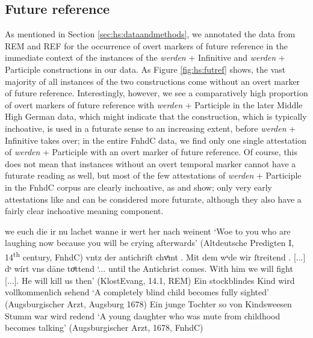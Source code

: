 \documentclass[output=paper,colorlinks,citecolor=brown]{langscibook}
\begin{document}
\subsection{Future reference} \label{sec:hs:futurereference}

As mentioned in Section \ref{sec:hs:dataandmethods}, we annotated the data from REM and REF for the occurrence of overt markers of future reference in the immediate context of the instances of the \textit{werden} + Infinitive and \textit{werden} + Participle constructions in our data. As Figure \ref{fig:hs:futref} shows, the vast majority of all instances of the two constructions come without an overt marker of future reference. Interestingly, however, we see a comparatively high proportion of overt markers of future reference with \textit{werden} + Participle in the later Middle High German data, which might indicate that the construction, which is typically inchoative, is used in a futurate sense to an increasing extent, before \textit{werden} + Infinitive takes over; in the entire FnhdC data, we find only one single attestation of \textit{werden} + Participle with an overt marker of future reference. Of course, this does not mean that instances without an overt temporal marker cannot have a futurate reading as well, but most of the few attestations of \textit{werden} + Participle in the FnhdC corpus are clearly inchoative, as  and  show; only very early attestations like  and  can be considered more futurate, although they also have a fairly clear inchoative meaning component.


\ea \label{ex:hs:fnhdc_wpart} 
    \ea \label{ex:hs:fnhdc_wpart1} we euch die ir nu lachet wanne ir wert her nach weinent `Woe to you who are laughing now because you will be crying afterwards'  (Altdeutsche Predigten I, 14\textsuperscript{th} century, FnhdC)
    \ex \label{ex:hs:antichrist}  vntz der antichriſt chvͦmt . Mit dem wˢde wir ſtreitend . [...] dˢ wírt vns dāne toͤttend `... until the Antichrist comes. With him we will fight [...]. He will kill us then' (KlostEvang, 14.1, REM)
    \ex \label{ex:hs:fnhdc_wpart2}  Ein stockblindes Kind wird vollkommenlich sehend `A completely blind child becomes fully sighted' (Augsburgischer Arzt, Augsburg 1678) 
    \ex \label{ex:hs:fnhdc_wpart3}  Ein junge Tochter so von Kindsweesen Stumm war wird redend `A young daughter who was mute from childhood becomes talking' (Augsburgischer Arzt, 1678, FnhdC) 
    \z
\z 
\end{document}
